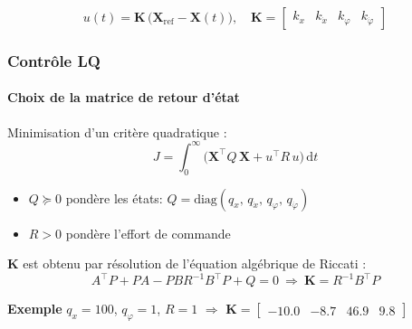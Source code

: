 \begin{frame}

\vspace{0.3cm}
\[
  u(t) = \mathbf{K}\,\bigl(\mathbf{X}_\mathrm{ref} - \mathbf{X}(t)\bigr), \quad
  \mathbf{K} = \begin{bmatrix} k_x & k_{\dot x} & k_\varphi & k_{\dot\varphi} \end{bmatrix}
\]

\end{frame}


\begin{frame}
\frametitle{Contrôle LQ}
\framesubtitle{Choix de la matrice de retour d'état}

Minimisation d'un critère quadratique :
\[
  J = \int_0^\infty \!\bigl(\mathbf{X}^\top Q\,\mathbf{X} + u^\top R\,u\bigr)\,\mathrm{d}t
\]
\begin{itemize}
  \item $Q \succeq 0$ pondère les états: $Q = \mathrm{diag}(q_x,\, q_{\dot x},\, q_\varphi,\, q_{\dot\varphi})$
  \item $R > 0$ pondère l'effort de commande
\end{itemize}

\vspace{0.3cm}
$\mathbf{K}$ est obtenu par résolution de l'équation algébrique de Riccati :
\[
  A^\top P + PA - PBR^{-1}B^\top P + Q = 0
  \ \Longrightarrow\ 
  \boxed{\mathbf{K} = R^{-1}B^\top P}
\]

\vspace{1em}

\textbf{Exemple} $q_x = 100$, $q_\varphi = 1$, $R = 1$ $\Longrightarrow$ $\mathbf{K} = \begin{bmatrix} -10.0 & -8.7 & 46.9 & 9.8 \end{bmatrix}$

\end{frame}


